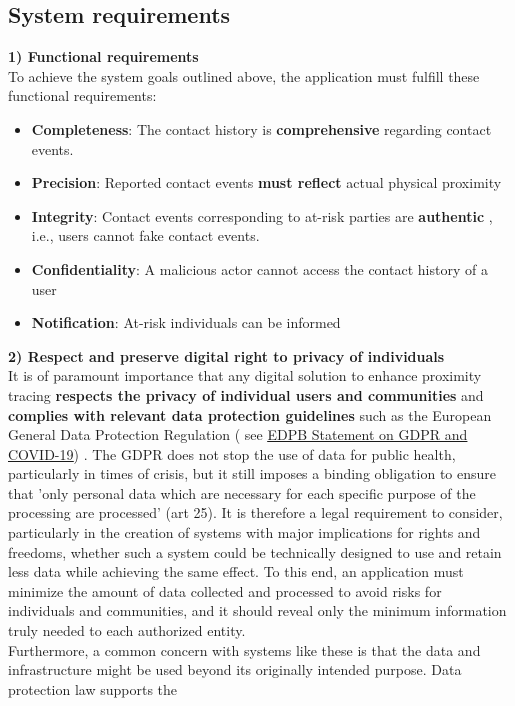 \documentclass[12pt,a4paper]{article}
\begin{document}
\subsection*{System requirements}
\textbf{1) Functional requirements}\\
To achieve the system goals outlined above, the application must fulfill these functional
requirements:
\begin{itemize}\itemsep0pt
\item \textbf{Completeness}:  The contact history is \textbf{comprehensive}  regarding contact events.
\item \textbf{Precision}:  Reported contact events \textbf{must reflect}  actual physical proximity
\item \textbf{Integrity}: Contact events corresponding to at-risk parties are \textbf{authentic} , i.e., users cannot fake contact events.
\item \textbf{Confidentiality}:  A malicious actor cannot access the contact history of a user
\item \textbf{Notification}:  At-risk individuals can be informed
\end{itemize}
\textbf{2) Respect and preserve digital right to privacy of individuals}\\
It is of paramount importance that any digital solution to enhance proximity tracing \textbf{respects the privacy of individual users and communities} and \textbf{complies with relevant data protection guidelines} such as the European General Data Protection Regulation ( see \href{http://edpb.europa.eu}{\underline{EDPB Statement on GDPR and COVID-19}}) . The GDPR does not stop the use of data for public health, particularly in times of crisis, but it still imposes a binding obligation to ensure that 'only personal data which are necessary for each specific purpose of the processing are processed' (art 25). It is therefore a legal requirement to consider, particularly in the creation of systems with major implications for rights and freedoms, whether such a system could be technically designed to use and retain less data while achieving the same effect. To this end, an application must minimize the amount of data collected and processed to avoid risks for individuals and communities, and it should reveal only the minimum information truly needed to each authorized entity.\\[0.3cm]
Furthermore, a common concern with systems like these is that the data and infrastructure
might be used beyond its originally intended purpose. Data protection law supports the
\end{document}
